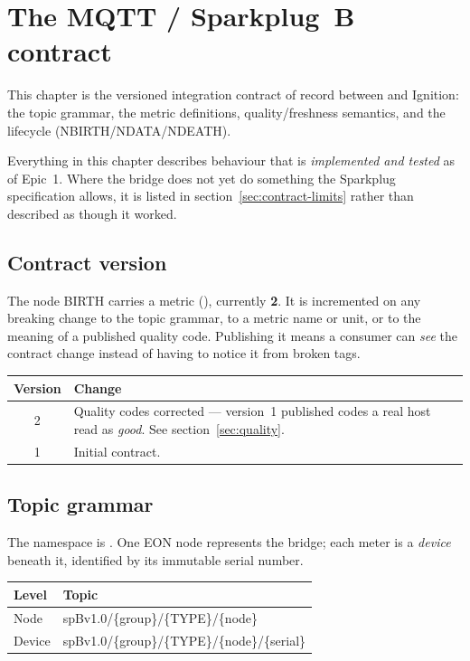 \chapter{The MQTT / Sparkplug~B contract}
\label{ch:contract}

This chapter is the versioned integration contract of record between \prog and Ignition:
the topic grammar, the metric definitions, quality/freshness semantics, and the
lifecycle (NBIRTH/NDATA/NDEATH).

\begin{note}
Everything in this chapter describes behaviour that is \emph{implemented and tested} as of
Epic~1. Where the bridge does not yet do something the Sparkplug specification allows, it
is listed in section~\ref{sec:contract-limits} rather than described as though it worked.
\end{note}

\section{Contract version}

The node BIRTH carries a metric  (), currently
\textbf{2}. It is incremented on any breaking change to the topic grammar, to a metric name
or unit, or to the meaning of a published quality code. Publishing it means a consumer can
\emph{see} the contract change instead of having to notice it from broken tags.

\begin{center}
\begin{tabular}{@{}c p{10.2cm}@{}}
\toprule
\textbf{Version} & \textbf{Change} \\
\midrule
2 & Quality codes corrected --- version~1 published codes a real host read as
    \emph{good}. See section~\ref{sec:quality}. \\
1 & Initial contract. \\
\bottomrule
\end{tabular}
\end{center}

\section{Topic grammar}

The namespace is . One EON node represents the bridge; each meter is a
\emph{device} beneath it, identified by its immutable serial number.

\begin{center}
\begin{tabular}{@{}l>{\ttfamily}l@{}}
\toprule
\normalfont\textbf{Level} & \normalfont\textbf{Topic} \\
\midrule
Node   & spBv1.0/\{group\}/\{TYPE\}/\{node\} \\
Device & spBv1.0/\{group\}/\{TYPE\}/\{node\}/\{serial\} \\
\bottomrule
\end{tabular}
\end{center}


